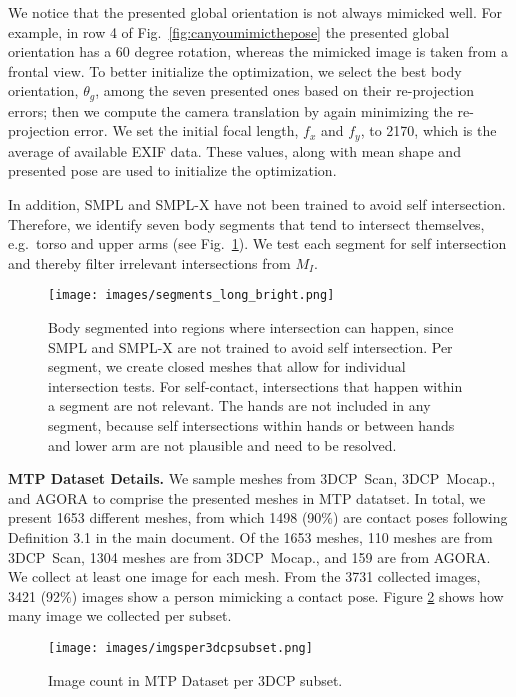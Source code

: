 \documentclass[final]{cvpr}
\newcommand{\mtp}{\mbox{MTP}\xspace}
\newcommand{\threedcp}{\mbox{3DCP}\xspace}
\newcommand{\threedcpscan}{\mbox{3DCP Scan}\xspace}
\newcommand{\threedcpmocap}{\mbox{3DCP Mocap.}\xspace}
\theoremstyle{definition}
\begin{document}
We notice that the presented global orientation is not always mimicked well. For example, in row 4 of Fig.~\ref{fig:canyoumimicthepose} the presented global orientation has a 60 degree rotation, whereas the mimicked image is taken from a frontal view.
To better initialize the optimization, we select the best body orientation, $\theta_g$, among the seven presented ones based on their re-projection errors; then we compute the camera translation by again minimizing the re-projection error.
We set the initial focal length, $f_x$ and $f_y$, to 2170, which is the average of available EXIF data. 
These values, along with mean shape and presented pose are used to initialize the optimization.


In addition, SMPL and SMPL-X have not been trained to avoid self intersection.
Therefore, we identify seven body segments that tend to intersect themselves, e.g.~torso and upper arms (see Fig.~\ref{fig:segments}). We test each segment for self intersection and thereby filter irrelevant intersections from $M_{I}$.

\begin{figure}
\centerline{		\texttt{[image: images/segments\_long\_bright.png]}}
\vspace{-0.04in}
	\caption{Body segmented into regions where intersection can happen, since SMPL and SMPL-X are not trained to avoid self intersection. Per segment, we create closed meshes that allow for individual intersection tests. For self-contact, intersections that happen within a segment are not relevant. The hands are not included in any segment, because self intersections within hands or between hands and lower arm are not plausible and need to be resolved.}
	\label{fig:segments}
\end{figure}

\textbf{MTP Dataset Details.} 
We sample meshes from \threedcpscan, \threedcpmocap, and AGORA \cite{patel2021agora} to comprise the presented meshes in \mtp datatset. 
In total, we present 1653 different meshes, from which 1498 (90\%) are contact poses following Definition 3.1 in the main document. 
Of the 1653 meshes, 110 meshes are from \threedcpscan, 1304 meshes are from \threedcpmocap, and 159 are from AGORA. 
We collect at least one image for each mesh.
From the 3731 collected images, 3421 (92\%) images show a person mimicking a contact pose. 
Figure \ref{fig:imgsper3dcpsubset} shows how many image we collected per subset.
\begin{figure}
\centerline{		\texttt{[image: images/imgsper3dcpsubset.png]}}
\vspace{-0.04in}
	\caption{Image count in MTP Dataset per \threedcp subset.}
	\label{fig:imgsper3dcpsubset}
\end{figure}
\end{document}
